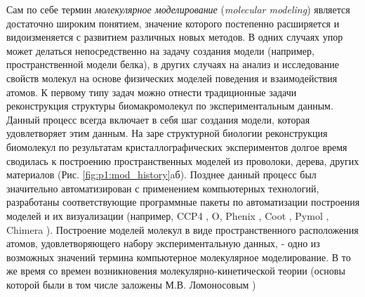 




Сам по себе термин \textit{молекулярное моделирование} (\textit{molecular modeling}) является достаточно широким понятием, значение которого постепенно расширяется и видоизменяется с развитием различных новых методов. В одних случаях упор может делаться непосредственно на задачу создания модели (например, пространственной модели белка), в других случаях на анализ и исследование свойств молекул на основе физических моделей поведения и взаимодействия атомов. К первому типу задач можно отнести традиционные задачи реконструкция структуры биомакромолекул по экспериментальным данным. Данный процесс всегда включает в себя шаг создания модели, которая удовлетворяет этим данным. На заре структурной биологии реконструкция биомолекул по результатам кристаллографических экспериментов долгое время сводилась к построению пространственных моделей из проволоки, дерева, других материалов (Рис. \ref{fig:p1:mod_history}aб). Позднее данный процесс был значительно автоматизирован с применением компьютерных технологий, разработаны соответствующие программные пакеты по автоматизации построения моделей и их визуализации (например, CCP4 \cite{winn_overview_2011}, O, Phenix \cite{liebschner_macromolecular_2019}, Coot  \cite{emsley_coot_2004}, Pymol \cite{schrodinger_pymol_2015}, Chimera \cite{pettersen_ucsf_2004}).  Построение моделей молекул в виде пространственного расположения атомов, удовлетворяющего набору экспериментальную данных, - одно из возможных значений термина компьютерное молекулярное моделирование. 
В то же время со времен возникновения молекулярно-кинетической теории (основы которой были в том числе заложены М.В. Ломоносовым \cite{lomonosov_sobranie_1950})
